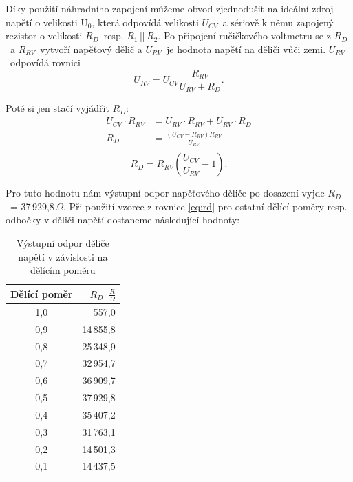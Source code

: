 \documentclass[a4paper,12pt]{article}   %
\newcommand{\ucv}{$U_{CV}$}
\newcommand{\urv}{$U_{RV}$}
\newcommand{\rrv}{$R_{RV}$}
\newcommand{\rd}{$R_{D}$}
\newcommand{\eucv}{U_{CV}}
\newcommand{\eurv}{U_{RV}}
\newcommand{\errv}{R_{RV}}
\newcommand{\erd}{R_{D}}
\begin{document}
Díky použití náhradního zapojení můžeme obvod zjednodušit na ideální zdroj napětí o velikosti U$_{0}$, která odpovídá velikosti \ucv ~a sériově k němu zapojený rezistor o velikosti \rd ~resp. $R_1$\,||\,$R_2$. Po připojení ručičkového voltmetru se z \rd ~a \rrv ~vytvoří napěťový dělič a \urv ~je hodnota napětí na děliči vůči zemi. \urv ~odpovídá rovnici
\begin{equation}
    \eurv = \eucv \frac{\errv}{\eurv+\erd}.
\end{equation}

Poté si jen stačí vyjádřit \rd:
\begin{equation*}
    \begin{split}
        \eucv\cdot\errv &= \eurv\cdot\errv+\eurv\cdot\erd\\
        \erd &= \frac{(\eucv-\errv)\errv}{\eurv} \\
    \end{split}
\end{equation*}
\begin{equation}
    \erd = \errv\left(\frac{\eucv}{\eurv}-1\right).
    \label{eq:rd}
\end{equation}

Pro tuto hodnotu nám výstupní odpor napěťového děliče po dosazení vyjde \rd ~= 37\,929,8\,$\Omega$. Při použití vzorce z rovnice \ref{eq:rd} pro ostatní dělící poměry resp. odbočky v děliči napětí dostaneme následující hodnoty:
\begin{table}[h!]
    \centering
    \begin{tabular}{|c|r|}
        \hline
        \rule{0pt}{2.5ex} Dělící poměr & \rd ~$\frac{R}{\Omega}$\\[.7ex] \hline\hline
        1,0   & 557,0     \\\hline
        0,9 & 14\,855,8   \\\hline
        0,8 & 25\,348,9   \\\hline
        0,7 & 32\,954,7   \\\hline
        0,6 & 36\,909,7   \\\hline
        0,5 & 37\,929,8   \\\hline
        0,4 & 35\,407,2   \\\hline
        0,3 & 31\,763,1   \\\hline
        0,2 & 14\,501,3   \\\hline
        0,1 & 14\,437,5   \\\hline
    \end{tabular}
    \caption{Výstupní odpor děliče napětí v závislosti na dělícím poměru}
    \label{tab:odpory}
\end{table}
\end{document}
